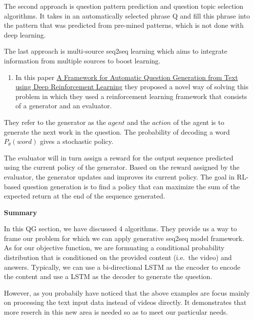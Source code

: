 \documentclass{acm_proc_article-sp}
\renewcommand{\paragraph}[1]{\vskip 6pt\noindent\textbf{#1 }}
\providecommand{\tightlist}{%
  \setlength{\itemsep}{0pt}\setlength{\parskip}{0pt}}
\begin{document}
The second approach is question pattern prediction and question topic
selection algorithms. It takes in an automatically selected phrase Q and
fill this phrase into the pattern that was predicted from pre-mined
patterns, which is not done with deep learning.

The last approach is multi-source seq2seq learning which aims to
integrate information from multiple sources to boost learning.

\begin{enumerate}
\def\labelenumi{\arabic{enumi}.}
\setcounter{enumi}{3}
\tightlist
\item
  In this paper \href{https://arxiv.org/pdf/1808.04961.pdf}{A Framework
  for Automatic Question Generation from Text using Deep Reinforcement
  Learning} they proposed a novel way of solving this problem in which
  they used a reinforcement learning framework that consists of a
  generator and an evaluator.
\end{enumerate}

They refer to the generator as the \(agent\) and the \(action\) of the
agent is to generate the next work in the question. The probability of
decoding a word \(P_{\theta}(word)\) gives a stochastic policy.

The evaluator will in turn assign a reward for the output sequence
predicted using the current policy of the generator. Based on the reward
assigned by the evaluator, the generator updates and improves its
current policy. The goal in RL-based question generation is to find a
policy that can maximize the sum of the expected return at the end of
the sequence generated.

\paragraph{Summary}\label{summary}

In this QG section, we have discussed 4 algorithms. They provide us a
way to frame our problem for which we can apply generative seq2seq model
framework. As for our objective function, we are formuating a
conditional probability distribution that is conditioned on the provided
content (i.e.~the video) and answers. Typically, we can use a
bi-directional LSTM as the encoder to encode the content and use a LSTM
as the decoder to generate the question.

However, as you probabily have noticed that the above examples are focus
mainly on processing the text input data instead of videos directly. It
demonstrates that more reserch in this new area is needed so as to meet
our particular needs.
\end{document}
